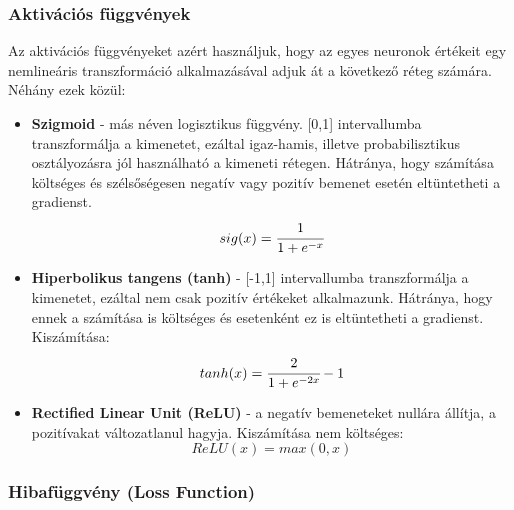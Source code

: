 \subsubsection{Aktivációs függvények}

Az aktivációs függvényeket azért használjuk, hogy az egyes neuronok értékeit egy nemlineáris transzformáció alkalmazásával adjuk át a következő réteg számára. Néhány ezek közül:
\begin{itemize}
 \item \textbf{Szigmoid} - más néven logisztikus függvény. [0,1] intervallumba transzformálja a kimenetet, ezáltal igaz-hamis, illetve probabilisztikus osztályozásra jól használható a kimeneti rétegen. Hátránya, hogy számítása költséges és szélsőségesen negatív vagy pozitív bemenet esetén eltüntetheti a gradienst.
\begin{equation}
	sig(x) = \cfrac{1}{1+e^{-x}}
\end{equation}
 \item \textbf{Hiperbolikus tangens (tanh)} - [-1,1] intervallumba transzformálja a kimenetet, ezáltal nem csak pozitív értékeket alkalmazunk. Hátránya, hogy ennek a számítása is költséges és esetenként ez is eltüntetheti a gradienst. Kiszámítása:
\begin{equation}
	tanh(x) = \cfrac{2}{1+e^{-2x}} - 1
\end{equation}
 \item \textbf{Rectified Linear Unit (ReLU)} - a negatív bemeneteket nullára állítja, a pozitívakat változatlanul hagyja. Kiszámítása nem költséges: \cite{deeplearningbook}
\begin{equation}
	ReLU(x) = max(0, x)
\end{equation}
 \end{itemize}

\subsubsection{Hibafüggvény (Loss Function)}

